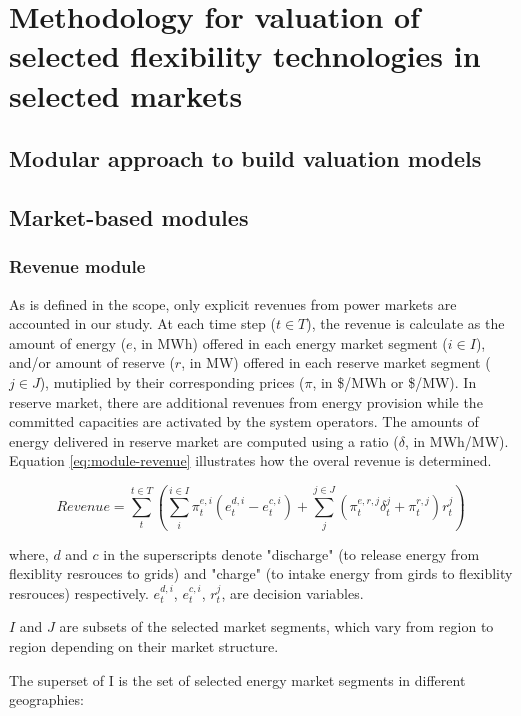 \chapter{Methodology for valuation of selected flexibility technologies in selected markets}

\section{Modular approach to build valuation models}

\section{Market-based modules}

\subsection{Revenue module}

As is defined in the scope, only explicit revenues from power markets are accounted in our study. At each time step ($t \in T$), the revenue is calculate as the  amount of energy ($e$, in MWh) offered in each energy market segment ($i \in I$), and/or amount of reserve ($r$, in MW) offered in each reserve market segment ($j \in J$), mutiplied by their corresponding prices ($\pi$, in \$/MWh or \$/MW). In reserve market, there are additional revenues from energy provision while the committed capacities are activated by the system operators. The amounts of energy delivered in reserve market are computed using a ratio ($\delta$, in MWh/MW). Equation \ref{eq:module-revenue} illustrates how the overal revenue is determined. 

\begin{equation}
\label{eq:module-revenue}
Revenue = \sum_{t}^{t \in T} \left( \sum_{i}^{i \in I}  \pi_t^{e,i} (e_t^{d,i} - e_t^{c,i})  + \sum_{j}^{j \in J} (\pi_t^{e,r,j} \delta_t^{j} + \pi_t^{r,j}) r_t^j \right)
\end{equation}

where, $d$ and $c$ in the superscripts denote "discharge" (to release energy from flexiblity resrouces to grids) and "charge" (to intake energy from girds to flexiblity resrouces) respectively. $e_t^{d,i}$, $e_t^{c,i}$, $r_t^{j}$, are decision variables.

$I$ and $J$ are subsets of the selected market segments, which vary from region to region depending on their market structure.

The superset of I is the set of selected energy market segments in different geographies:


